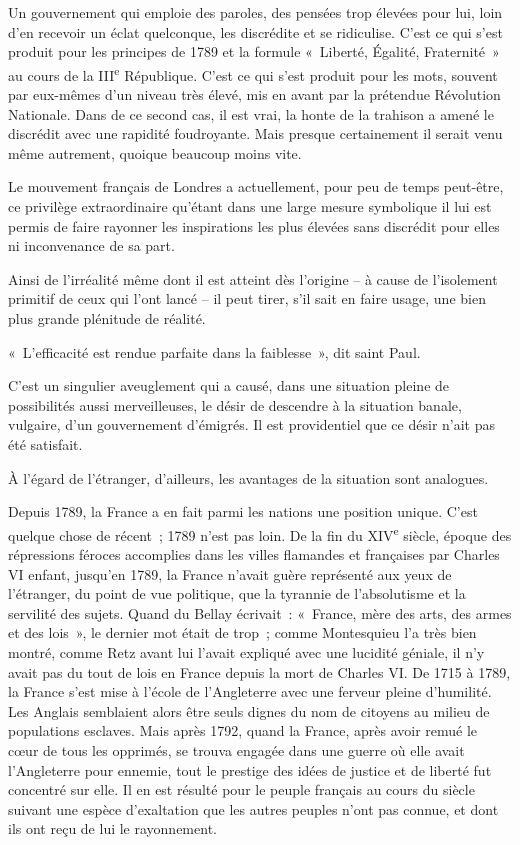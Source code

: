 \documentclass[french,twoside]{book} %
\begin{document}
Un gouvernement qui emploie des paroles, des pensées trop élevées pour lui, loin d'en recevoir un éclat quelconque, les discrédite et se ridiculise. C'est ce qui s'est produit pour les principes de 1789 et la formule « Liberté, Égalité, Fraternité » au cours de la III\textsuperscript{e} République. C'est ce qui s'est produit pour les mots, souvent par eux-mêmes d'un niveau très élevé, mis en avant par la prétendue Révolution Nationale. Dans de ce second cas, il est vrai, la honte de la trahison a amené le discrédit avec une rapidité foudroyante. Mais presque certainement il serait venu même autrement, quoique beaucoup moins vite.\par
Le mouvement français de Londres a actuellement, pour peu de temps peut-être, ce privilège extraordinaire qu'étant dans une large mesure symbolique il lui est permis de faire rayonner les inspirations les plus élevées sans discrédit pour elles ni inconvenance de sa part.\par
Ainsi de l'irréalité même dont il est atteint dès l'origine – à cause de l'isolement primitif de ceux qui l'ont lancé – il peut tirer, s'il sait en faire usage, une bien plus grande plénitude de réalité.\par
« L'efficacité est rendue parfaite dans la faiblesse », dit saint Paul.\par
C'est un singulier aveuglement qui a causé, dans une situation pleine de possibilités aussi merveilleuses, le désir de descendre à la situation banale, vulgaire, d'un gouvernement d'émigrés. Il est providentiel que ce désir n'ait pas été satisfait.\par
À l'égard de l'étranger, d'ailleurs, les avantages de la situation sont analogues.\par
Depuis 1789, la France a en fait parmi les nations une position unique. C'est quelque chose de récent ; 1789 n'est pas loin. De la fin du XIV\textsuperscript{e} siècle, époque des répressions féroces accomplies dans les villes flamandes et françaises par Charles VI enfant, jusqu'en 1789, la France n'avait guère représenté aux yeux de l'étranger, du point de vue politique, que la tyrannie de l'absolutisme et la servilité des sujets. Quand du Bellay écrivait : « France, mère des arts, des armes et des lois », le dernier mot était de trop ; comme Montesquieu l'a très bien montré, comme Retz avant lui l'avait expliqué avec une lucidité géniale, il n'y avait pas du tout de lois en France depuis la mort de Charles VI. De 1715 à 1789, la France s'est mise à l'école de l'Angleterre avec une ferveur pleine d'humilité. Les Anglais semblaient alors être seuls dignes du nom de citoyens au milieu de populations esclaves. Mais après 1792, quand la France, après avoir remué le cœur de tous les opprimés, se trouva engagée dans une guerre où elle avait l'Angleterre pour ennemie, tout le prestige des idées de justice et de liberté fut concentré sur elle. Il en est résulté pour le peuple français au cours du siècle suivant une espèce d'exaltation que les autres peuples n'ont pas connue, et dont ils ont reçu de lui le rayonnement.\par
\end{document}
